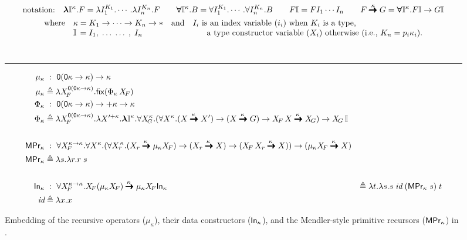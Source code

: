 \begin{landscape}
\begin{figure}
\begin{singlespace}
\begin{multline*} \text{notation:}\quad
   \boldsymbol{\lambda}\mathbb{I}^\kappa.F =
	\lambda I_1^{K_1}.\cdots.\lambda I_n^{K_n}.F \qquad
   \boldsymbol{\forall}\mathbb{I}^\kappa.B =
	\forall I_1^{K_1}.\cdots.\forall I_n^{K_n}.B \qquad
   F\mathbb{I} = F I_1 \cdots I_n \qquad
   F \stackrel{\kappa}{\pmb{\pmb{->}}} G =
	\boldsymbol{\forall}\mathbb{I}^\kappa.F\mathbb{I} -> G\mathbb{I} \\
\begin{array}{lll}
\text{where}
 	& \kappa = K_1 -> \cdots -> K_n -> * & \text{and} ~~~
 	\text{$I_i$ is an index variable ($i_i$) when $K_i$ is a type,}
 		\\
 	& \mathbb{I}\,=I_1,\;\dots\;\dots\;,\;I_n& \qquad~\qquad
		\text{a type constructor variable ($X_i$) otherwise
			({i.e.}, $K_n=p_i\kappa_i$).}
\end{array}
\end{multline*} ~ \vspace*{-5pt}
\hrule  \vspace*{-2pt}
\begin{align*}
\mu_\kappa &\;:~ \mathsf{0}(\mathsf{0}\kappa -> \kappa) -> \kappa \\
\mu_\kappa &\triangleq
\l X_{\!F}^{\mathsf{0}(\mathsf{0}\kappa -> \kappa)}.\fix(\Phi_\kappa\,X_{\!F})\\
\Phi_\kappa &\;:~ \mathsf{0}(\mathsf{0}\kappa -> \kappa) -> +\kappa -> \kappa \\
\Phi_\kappa &\triangleq \l X_{\!F}^{\mathsf{0}(\mathsf{0}\kappa -> \kappa)}.
\l X'^{+\kappa}.\boldsymbol{\l}\mathbb{I}^\kappa.
\forall X_{\!G}^\kappa.
(\forall X^\kappa. (X \karrow{\kappa} X')
		-> (X \karrow{\kappa} G)
		-> X_{\!F}\,X \karrow{\kappa} X_{\!G} ) -> X_{\!G}\,\mathbb{I}\\
~\\
\MPr_\kappa &\;:~
	\forall X_{\!F}^{\kappa-> \kappa}.\forall X^\kappa.
	(\forall {X_r}^{\!\!\kappa}.
	 (X_r \karrow{\kappa} \mu_\kappa X_{\!F}) ->
	 (X_r \karrow{\kappa} X) ->
	 (X_{\!F}\,X_r \karrow{\kappa} X) ) ->
	 (\mu_\kappa X_{\!F} \karrow{\kappa} X) \\
\MPr_\kappa &\triangleq \l s.\l r.r\;s \\
~\\
\In_\kappa &\;:~ \forall X_{\!F}^{\kappa-> \kappa}.
		X_{\!F}(\mu_\kappa X_{\!F}) \karrow{\kappa} \mu_\kappa X_{\!F}
\In_\kappa &\triangleq \l t.\l s.s\;\textit{id}\;(\MPr_\kappa\;s)\;t \\
\textit{id} &\triangleq \l x.x
\end{align*}
\end{singlespace}
\caption{Embedding of the recursive operators ($\mu_\kappa$),
	their data constructors ($\mathsf{In}_\kappa$),
	and the Mendler-style primitive recursors ($\mathsf{MPr}_\kappa$) in \Fixi.}
\label{fig:embedMPr}
\end{figure}
\end{landscape}

